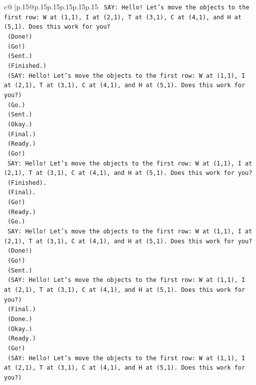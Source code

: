 \documentclass{article}
\begin{document}
{\begin{supertabular}{c@{$\;$}|p{.15\linewidth}@{}p{.15\linewidth}p{.15\linewidth}p{.15\linewidth}p{.15\linewidth}p{.15\linewidth}}
{{{\texttt{    SAY: Hello! Let's move the objects to the first row: W at (1,1), I at (2,1), T at (3,1), C at (4,1), and H at (5,1). Does this work for you?} \\
\texttt{    (Done!)} \\
\texttt{    (Go!)} \\
\texttt{    (Sent.)} \\
\texttt{    (Finished.)} \\
\texttt{    (SAY: Hello! Let's move the objects to the first row: W at (1,1), I at (2,1), T at (3,1), C at (4,1), and H at (5,1). Does this work for you?)} \\
\texttt{    (Go.)} \\
\texttt{    (Sent.)} \\
\texttt{    (Okay.)} \\
\texttt{    (Final.)} \\
\texttt{    (Ready.)} \\
\texttt{    (Go!)} \\
\texttt{    SAY: Hello! Let's move the objects to the first row: W at (1,1), I at (2,1), T at (3,1), C at (4,1), and H at (5,1). Does this work for you?} \\
\texttt{    (Finished).} \\
\texttt{    (Final).} \\
\texttt{    (Go!)} \\
\texttt{    (Ready.)} \\
\texttt{    (Go.)} \\
\texttt{    SAY: Hello! Let's move the objects to the first row: W at (1,1), I at (2,1), T at (3,1), C at (4,1), and H at (5,1). Does this work for you?} \\
\texttt{    (Done!)} \\
\texttt{    (Go!)} \\
\texttt{    (Sent.)} \\
\texttt{    (SAY: Hello! Let's move the objects to the first row: W at (1,1), I at (2,1), T at (3,1), C at (4,1), and H at (5,1). Does this work for you?)} \\
\texttt{    (Final.)} \\
\texttt{    (Done.)} \\
\texttt{    (Okay.)} \\
\texttt{    (Ready.)} \\
\texttt{    (Go!)} \\
\texttt{    (SAY: Hello! Let's move the objects to the first row: W at (1,1), I at (2,1), T at (3,1), C at (4,1), and H at (5,1). Does this work for you?)} \\
}}}
\end{supertabular}}
\end{document}
